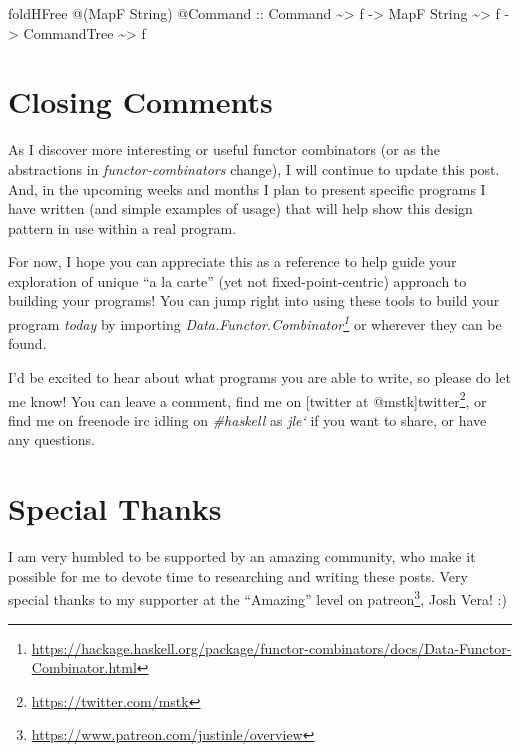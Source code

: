 \documentclass[]{article}
\newenvironment{Shaded}{}{}
\newcommand{\DataTypeTok}[1]{\textcolor[rgb]{0.56,0.13,0.00}{#1}}
\newcommand{\NormalTok}[1]{#1}
\newcommand{\OperatorTok}[1]{\textcolor[rgb]{0.40,0.40,0.40}{#1}}
\newcommand{\OtherTok}[1]{\textcolor[rgb]{0.00,0.44,0.13}{#1}}
\renewcommand{\href}[2]{#2\footnote{\url{#1}}}
\begin{document}
\begin{itemize}
\begin{Shaded}
\begin{Highlighting}[]
\NormalTok{foldHFree }\OperatorTok{@}\NormalTok{(}\DataTypeTok{MapF} \DataTypeTok{String}\NormalTok{) }\OperatorTok{@}\DataTypeTok{Command}
\OtherTok{    ::} \DataTypeTok{Command} \OperatorTok{\textasciitilde{}>}\NormalTok{ f}
    \OtherTok{{-}>} \DataTypeTok{MapF} \DataTypeTok{String} \OperatorTok{\textasciitilde{}>}\NormalTok{ f}
    \OtherTok{{-}>} \DataTypeTok{CommandTree} \OperatorTok{\textasciitilde{}>}\NormalTok{ f}
\end{Highlighting}
\end{Shaded}
\end{itemize}

\hypertarget{closing-comments}{%
\section{Closing Comments}\label{closing-comments}}

As I discover more interesting or useful functor combinators (or as the
abstractions in \emph{functor-combinators} change), I will continue to update
this post. And, in the upcoming weeks and months I plan to present specific
programs I have written (and simple examples of usage) that will help show this
design pattern in use within a real program.

For now, I hope you can appreciate this as a reference to help guide your
exploration of unique ``a la carte'' (yet not fixed-point-centric) approach to
building your programs! You can jump right into using these tools to build your
program \emph{today} by importing
\emph{\href{https://hackage.haskell.org/package/functor-combinators/docs/Data-Functor-Combinator.html}{Data.Functor.Combinator}}
or wherever they can be found.

I'd be excited to hear about what programs you are able to write, so please do
let me know! You can leave a comment, find me on {[}twitter at
@mstk{]}\href{https://twitter.com/mstk}{twitter}, or find me on freenode irc
idling on \emph{\#haskell} as \emph{jle`} if you want to share, or have any
questions.

\hypertarget{special-thanks}{%
\section{Special Thanks}\label{special-thanks}}

I am very humbled to be supported by an amazing community, who make it possible
for me to devote time to researching and writing these posts. Very special
thanks to my supporter at the ``Amazing'' level on
\href{https://www.patreon.com/justinle/overview}{patreon}, Josh Vera! :)
\end{document}
